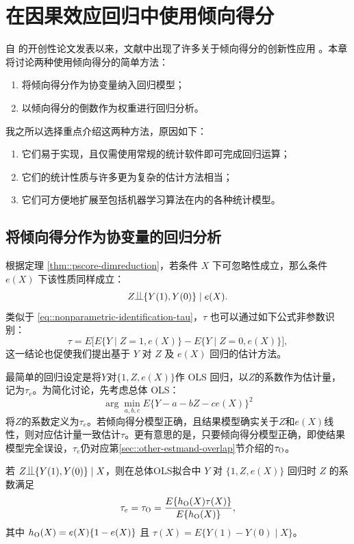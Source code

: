 
\chapter{在因果效应回归中使用倾向得分}\label{chapter::pscore-unification}
 

自 \citet{rosenbaum1983central} 的开创性论文发表以来，文献中出现了许多关于倾向得分的创新性应用 \citep[e.g.,][]{bang2005doubly, robins2007comment, van2011targeted, vansteelandt2014regression}。本章将讨论两种使用倾向得分的简单方法： 
\begin{enumerate}
\item
将倾向得分作为协变量纳入回归模型；
\item
以倾向得分的倒数作为权重进行回归分析。 
\end{enumerate}
我之所以选择重点介绍这两种方法，原因如下： 
\begin{enumerate}
\item
它们易于实现，且仅需使用常规的统计软件即可完成回归运算；
\item
它们的统计性质与许多更为复杂的估计方法相当；
\item
它们可方便地扩展至包括机器学习算法在内的各种统计模型。
\end{enumerate}

 
\section{将倾向得分作为协变量的回归分析}
\label{sec::regress-on-pscore}

根据定理 \ref{thm::pscore-dimreduction}，若条件 $X$ 下可忽略性成立，那么条件 $e(X)$ 下该性质同样成立：
$$
Z\ind \{ Y(1) , Y(0)\} \mid e(X). 
$$ 
类似于 \eqref{eq::nonparametric-identification-tau}，$\tau$ 也可以通过如下公式非参数识别：
$$
\tau = E\Big[   E\{ Y\mid Z=1, e(X) \} - E\{ Y\mid Z=0, e(X) \} \Big] ,
$$
这一结论也促使我们提出基于 $Y$ 对 $Z$ 及 $e(X)$ 回归的估计方法。 



最简单的回归设定是将$Y$对$\{1, Z, e(X)\}$作 OLS 回归，以$Z$的系数作为估计量，记为$\tau_{e}$。为简化讨论，先考虑总体 OLS：
$$
\arg\min_{a,b,c}  E\{ Y - a - bZ - c  e(X)  \}^2
$$
将$Z$的系数定义为$\tau_{e}$。若倾向得分模型正确，且结果模型确实关于$Z$和$e(X)$线性，则对应估计量一致估计$\tau$。更有意思的是，只要倾向得分模型正确，即使结果模型完全误设，$\tau_{e}$仍对应第\ref{sec::other-estmand-overlap}节介绍的$\tau_\textsc{O}$。 

\begin{theorem}\label{thm::ols-pscore-tau-o}
若 $Z\ind \{  Y(1), Y(0) \} \mid X$，则在总体OLS拟合中 $Y$ 对 $\{1, Z, e(X)\}$ 回归时 $Z$ 的系数满足
$$
\tau_e=  \tau_\textsc{O} = \frac{  E\{ h_\textsc{O}(X) \tau(X) \} }{ E\{ h_\textsc{O}(X) \} },
$$
其中 $ h_\textsc{O}(X)  = e(X) \{ 1- e(X)  \} $ 且 $\tau(X) = E\{ Y(1) - Y(0) \mid X  \}$。 
\end{theorem}


